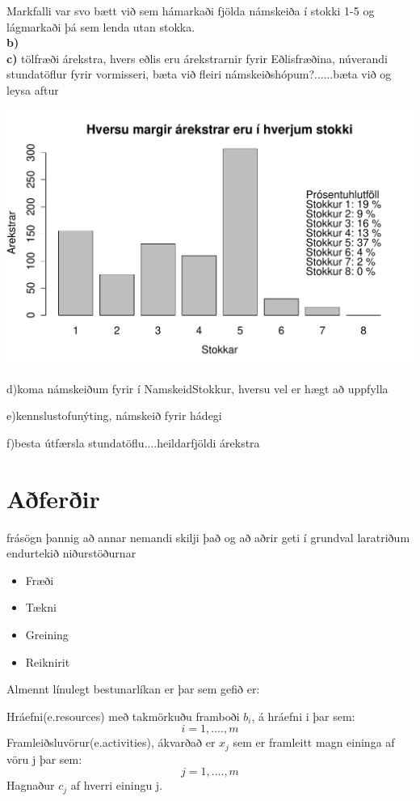 \documentclass[a4paper,12pt]{article}
\begin{document}
Markfalli var svo bætt við sem hámarkaði fjölda námskeiða í stokki 1-5 og lágmarkaði þá sem lenda utan stokka.\\
\textbf{b)} \\


\textbf{c)} tölfræði árekstra, hvers eðlis eru árekstrarnir fyrir Eðlisfræðina, núverandi stundatöflur fyrir vormisseri, bæta við fleiri námskeiðshópum?......bæta við og leysa aftur

\begin{center}
\includegraphics[scale=0.5]{c_lidur_plot}
\end{center}
d)koma námskeiðum fyrir í NamskeidStokkur, hversu vel er hægt að uppfylla


e)kennslustofunýting, námskeið fyrir hádegi


f)besta útfærsla stundatöflu....heildarfjöldi árekstra

\section{Aðferðir}
frásögn þannig að annar nemandi skilji það og að aðrir geti í
grundval laratriðum endurtekið niðurstöðurnar
\begin{itemize}
\item Fræði
\item Tækni
\item Greining
\item Reiknirit
\end{itemize}


Almennt línulegt bestunarlíkan er þar sem gefið er:

Hráefni(e.resources) með takmörkuðu framboði $b_i$, á hráefni i þar sem:
\[i=1,....,m\]
Framleiðsluvörur(e.activities), ákvarðað er $x_j$ sem er framleitt magn eininga af vöru j þar sem:
\[j=1,....,m\]
Hagnaður $c_j$ af hverri einingu j. 
\end{document}
